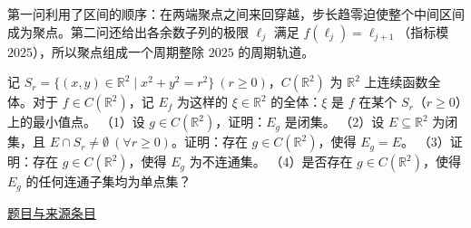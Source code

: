\documentclass[12pt,fontset=fandol]{ctexart}
\begin{document}
\begin{remark}[方法与条件]第一问利用了区间的顺序：在两端聚点之间来回穿越，步长趋零迫使整个中间区间成为聚点。第二问还给出各余数子列的极限 $\ell_j$ 满足 $f(\ell_j)=\ell_{j+1}$（指标模 $2025$），所以聚点组成一个周期整除 $2025$ 的周期轨道。\end{remark}

\begin{example}\label{ex:fin16-high:8}\label{pr:fin16-high:8}

记 $S_r = \{(x,y) \in \mathbb{R}^2 \mid x^2 + y^2 = r^2\}\ (r \geq 0)$，$C(\mathbb{R}^2)$ 为 $\mathbb{R}^2$ 上连续函数全体。对于 $f \in C(\mathbb{R}^2)$，记 $E_f$ 为这样的 $\xi \in \mathbb{R}^2$ 的全体：$\xi$ 是 $f$ 在某个 $S_r$（$r \geq 0$）上的最小值点。
（1）设 $g \in C(\mathbb{R}^2)$，证明：$E_g$ 是闭集。
（2）设 $E \subseteq \mathbb{R}^2$ 为闭集，且 $E \cap S_r \neq \emptyset\ (\forall r \geq 0)$。证明：存在 $g \in C(\mathbb{R}^2)$，使得 $E_g = E$。
（3）证明：存在 $g \in C(\mathbb{R}^2)$，使得 $E_g$ 为不连通集。
（4）是否存在 $g \in C(\mathbb{R}^2)$，使得 $E_g$ 的任何连通子集均为单点集？

\par\href{https://github.com/lzxcr/cmc-mathematics/blob/64916fa1fdbc3e444a652eca204d5669058ee321/src/problems/finals/16/09.md}{题目与来源条目}

\end{example}
\end{document}
